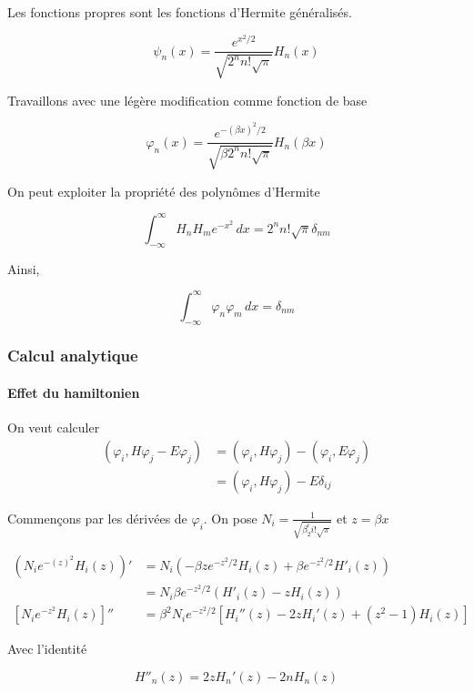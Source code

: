 \documentclass[
]{article}
\begin{document}
Les fonctions propres sont les fonctions d'Hermite généralisés.

\[
\psi_{n}(x)= \frac{e^{x^{2}/2}}{\sqrt{2^{n}n!\sqrt{ \pi }  }}H_{n}(x)
\]

Travaillons avec une légère modification comme fonction de base

\[
\varphi_{n}(x)= \frac{e^{-(\beta x)^{2}/2}}{\sqrt{\beta2^{n}n!\sqrt{ \pi }  }}H_{n}(\beta x)
\]

On peut exploiter la propriété des polynômes d'Hermite

\[
\int_{-\infty}^{\infty} H_{n}H_{m} e^{-x^{2}} \, dx = 2^{n}n!\sqrt{ \pi }\delta_{nm} 
\]

Ainsi,

\[
\int_{-\infty}^{\infty} \varphi_{n}\varphi_{m} \, dx= \delta_{nm} 
\]

\hypertarget{calcul-analytique}{%
\subsubsection{Calcul analytique}\label{calcul-analytique}}

\hypertarget{effet-du-hamiltonien}{%
\paragraph{Effet du hamiltonien}\label{effet-du-hamiltonien}}

On veut calculer \[
\begin{aligned}
(\varphi_{i},H\varphi_{j}-E\varphi_{j})  & =(\varphi_{i},H\varphi_{j})-(\varphi_{i},E\varphi_{j}) \\
 & =(\varphi_{i},H\varphi_{j})-E\delta _{ij}
\end{aligned}
\]

Commençons par les dérivées de \(\varphi_{i}\). On pose
\(N_{i}=\frac{1}{\sqrt{ \beta_{2}^{i}i!\sqrt{ \pi } }}\) et
\(z = \beta x\)

\[
\begin{aligned}
(N_{i}e^{-(z)^{2}}H_{i}(z))' & = N_{i}(-\beta ze^{-z^{2}/2}H_{i}(z)+\beta e^{-z^{2}/2}H'_{i}(z)) \\
 & =N_{i}\beta e^{-z^{2}/2}(H'_{i}(z)-zH_{i}(z)) \\
[N_{i}e^{-z^{2}}H_{i}(z)]'' & = \beta^{2}N_{i}​e^{−z^{2}/2}[H_{i}''​(z)−2zH_{i}'​(z)+(z^{2}−1)H_{i}​(z)]
\end{aligned}
\]

Avec l'identité

\[
H''_{n}(z)=2zH_{n}'(z)-2nH_{n}(z)
\]
\end{document}
